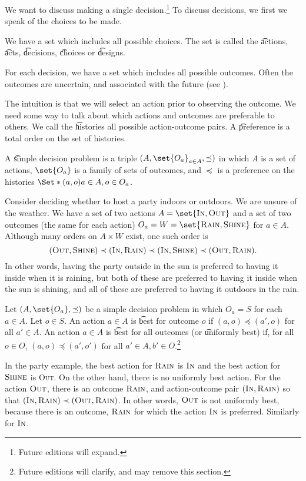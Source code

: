 

We want to discuss making a single decision.\footnote{Future editions will expand.}
To discuss decisions, we first we speak of the choices to be made.


We have a set which includes all possible choices.
The set is called the \t{actions}, \t{acts}, \t{decisions}, \t{choices} or \t{designs}.

For each decision, we have a set which includes all possible outcomes.
Often the outcomes are uncertain, and associated with the future (see ).

The intuition is that we will select an action prior to observing the outcome.
We need some way to talk about which actions and outcomes are preferable to others.
We call the \t{histories} all possible action-outcome pairs.
A \t{preference} is a total order on the set of histories.

A \t{simple decision problem} is a triple $(A, \set{O_a}_{a \in A}, \preceq)$ in which $A$ is a set of actions, $\set{O_a}$ is a family of sets of outcomes, and $\preceq$ is a preference on the histories $\Set*{(a, o)}{a \in A, o \in O_a}$.



Consider deciding whether to host a party indoors or outdoors.
We are unsure of the weather.
We have a set of two actions $A = \set{\textsc{In}, \textsc{Out}}$ and a set of two outcomes (the same for each action) $O_a = W = \set{\textsc{Rain}, \textsc{Shine}}$ for $a \in A$.
Although many orders on $A \times W$ exist, one such order is
\[
	(\textsc{Out}, \textsc{Shine}) \prec (\textsc{In}, \textsc{Rain}) \prec (\textsc{In}, \textsc{Shine}) \prec (\textsc{Out}, \textsc{Rain}).
\]
In other words, having the party outside in the sun is preferred to having it inside when it is raining, but both of these are preferred to having it inside when the sun is shining, and all of these are preferred to having it outdoors in the rain.


Let $(A, \set{O_a}, \preceq)$ be a simple decision problem in which $O_a = S$ for each $a \in A$.
Let $o \in S$.
An action $a \in A$ is \t{best for outcome $o$} if $(a, o) \preceq (a', o)$ for all $a' \in A$.
An action $a \in A$ is \t{best for all outcomes} (or \t{uniformly best}) if, for all $o \in O$, $(a, o) \preceq (a', o')$ for all $a' \in A, b' \in O$.\footnote{Future editions will clarify, and may remove this section.}

In the party example, the best action for $\textsc{Rain}$ is $\textsc{In}$ and the best action for $\textsc{Shine}$ is \textsc{Out}.
On the other hand, there is no uniformly best action.
For the action $\textsc{Out}$, there is an outcome $\textsc{Rain}$, and action-outcome pair $(\textsc{In}, \textsc{Rain})$ so that $(\textsc{In}, \textsc{Rain}) \prec (\textsc{Out}, \textsc{Rain})$.
In other words, $\textsc{Out}$ is not uniformly best, because there is an outcome, $\textsc{Rain}$ for which the action $\textsc{In}$ is preferred.
Similarly for $\textsc{In}$.
